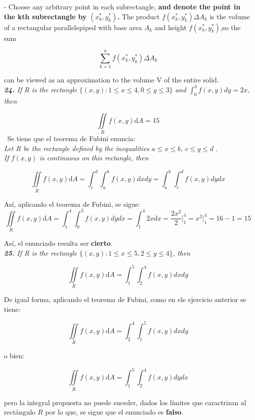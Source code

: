 \documentclass[a4paper,12pt]{article}
\begin{document}
	- Choose any arbitrary point in each subrectangle, \textbf{and denote the point in
	the kth subrectangle by $ (x^{*}_{k}, y^{*}_{k}) $.} The product
	$ f(x^{*}_{k}, y^{*}_{k}) \Delta A_k$  is the volume of a rectangular
	parallelepiped with base area $A_k$ and height $f(x^{*}_{k}, y^{*}_{k})$,so the sum

		$$ \sum_{k=1}^{n} f(x^{*}_{k}, y^{*}_{k}) \Delta A_{k} $$

	can be viewed as an approximation to the volume V of the entire solid.\\

	\textit{\textbf{24.} If R is the rectangle $ \{(x,y):1 \leq x \leq 4,0 \leq y \leq 3\} $
			and $\int_{0}^{3} f(x,y) dy = 2x$, then}

		$$ \iint\limits_{R} f(x,y)\mathrm{d}A = 15 $$
	\
	Se tiene que el teorema de Fubini enuncia:\\
	\textit{ Let R be the rectangle defined by the inequalities $a \leq x \leq b$, $c \leq y \leq d$ }.\\
	\textit{ If $f(x, y)$ is continuous on this rectangle, then }

		$$ \iint\limits_{R} f(x,y)\mathrm{d}A = \int_{c}^{d} \int_{a}^{b} f(x,y) dx dy
			= \int_{a}^{b} \int_{c}^{d} f(x,y) dy dx  $$

	Así, aplicando el teorema de Fubini, se sigue:
		$$ \iint\limits_{R} f(x,y)\mathrm{d}A = \int_{1}^{4} \int_{0}^{3} f(x,y) dy dx
		 	= \int_{1}^{4} 2x dx = \frac{2x^2}{2} \Big|_1^4 = x^2 \Big|_1^4 = 16 - 1 = 15 $$

		Así, el enunciado resulta ser \textbf{cierto}.\\

	\textit{\textbf{25.} If R is the rectangle $ \{(x,y):1 \leq x \leq 5,2 \leq y \leq 4\} $,
			then}

		$$ \iint\limits_{R} f(x,y)\mathrm{d}A = \int_{1}^{5} \int_{2}^{4} f(x,y) dx dy $$

	De igual forma, aplicando el teorema de Fubini, como en ele ejercicio anterior se tiene:

		$$ \iint\limits_{R} f(x,y)\mathrm{d}A = \int_{2}^{4} \int_{1}^{5} f(x,y) dx dy $$

			o bien:

		$$ \iint\limits_{R} f(x,y)\mathrm{d}A = \int_{1}^{5} \int_{2}^{4} f(x,y) dy dx $$

	pero la integral propuesta no puede suceder, dados los límites que caractrizan
	al rectángulo $R$ por lo que, se sigue que el enunciado es \textbf{falso}.\\
\end{document}
